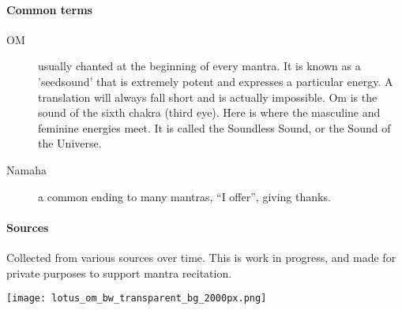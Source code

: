 \begin{intersong}
  \paragraph{Common terms}
  \begin{description}
   \item[OM] usually chanted at the beginning of every mantra. It is known as a 'seedsound' that 
     is extremely potent and expresses a particular energy. A translation will always fall short 
     and is actually impossible. Om is the sound of the sixth chakra (third eye). Here is where 
     the masculine and feminine energies meet. It is called the Soundless Sound, or the Sound of 
     the Universe.
   \item[Namaha] a common ending to many mantras, “I offer”, giving thanks.
  \end{description}

  \paragraph{Sources}
  Collected from various sources over time. This is work in progress, and made for private 
  purposes to support mantra recitation.

  \begin{center}%
    \vfill%
    \texttt{[image: lotus\_om\_bw\_transparent\_bg\_2000px.png]}%
    \vfill%
  \end{center}%
\end{intersong}


